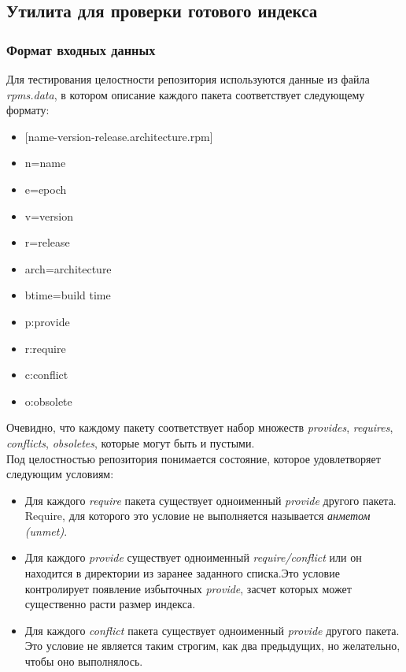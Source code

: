 \subsection{Утилита для проверки готового индекса}
\subsubsection{Формат входных данных}
Для тестирования целостности репозитория используются данные из файла \textit{rpms.data},
в котором описание каждого пакета соответствует следующему формату:
\begin{itemize}
\item{[name-version-release.architecture.rpm] }
\item{n=name} 
\item{e=epoch}
\item{v=version}
\item{r=release}
\item{arch=architecture}
\item{btime=build time}
\item{p:provide}
\item{r:require}
\item{c:conflict}
\item{o:obsolete}
\end{itemize}
Очевидно, что каждому пакету соответствует набор множеств \textit{provides},
\textit{requires}, \textit{conflicts}, \textit{obsoletes}, которые могут быть и пустыми.\\

Под целостностью репозитория понимается состояние, которое удовлетворяет следующим
условиям:
\begin{itemize}
\item{Для каждого \textit{require} пакета существует одноименный \textit{provide} 
другого пакета. Require, для которого это условие не выполняется
называется \textit{анметом (unmet)}. }
\item{Для каждого \textit{provide} существует одноименный \textit{require/conflict} или
он находится в директории из заранее заданного списка.Это условие 
контролирует появление избыточных \textit{provide}, засчет которых %
может существенно расти размер индекса.}
\item{Для каждого \textit{conflict} пакета существует одноименный \textit{provide} 
другого пакета. Это условие не является таким строгим, как два предыдущих,
но желательно, чтобы оно выполнялось. }
\end{itemize}

